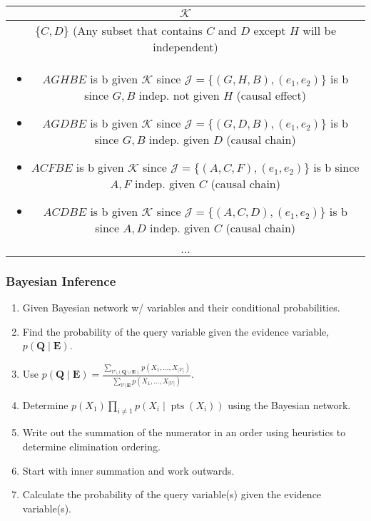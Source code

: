 \begin{example}
    \begin{center}
        \begin{tabular}{c}
            \toprule
            $\mathcal{K}$ \\
            \midrule
            $\{C,D\}$ (Any subset that contains $C$ and $D$ except $H$ will be independent) \\
            \multicolumn{1}{p{\linewidth}}{
                \begin{itemize}
                    \item $AGHBE$ is b given $\mathcal{K}$ since $\mathcal{J} = \{(G,H,B),(e_1,e_2)\}$ is b since $G,B$ indep. not given $H$ (causal effect)
                    \item $AGDBE$ is b given $\mathcal{K}$ since $\mathcal{J} = \{(G,D,B),(e_1,e_2)\}$ is b since $G,B$ indep. given $D$ (causal chain)
                    \item $ACFBE$ is b given $\mathcal{K}$ since $\mathcal{J} = \{(A,C,F),(e_1,e_2)\}$ is b since $A,F$ indep. given $C$ (causal chain)
                    \item $ACDBE$ is b given $\mathcal{K}$ since $\mathcal{J} = \{(A,C,D),(e_1,e_2)\}$ is b since $A,D$ indep. given $C$ (causal chain)
                \end{itemize}} \\
            \midrule
            $\ldots$ \\
            \toprule
        \end{tabular}
    \end{center}
\end{example}
\newpage

\subsubsection{Bayesian Inference}
\begin{process}
    \begin{enumerate}
        \item Given Bayesian network w/ variables and their conditional probabilities.
        \item Find the probability of the query variable given the evidence variable, $p(\mathbf{Q} \mid \mathbf{E})$.
        \item Use $p(\mathbf{Q} \mid \mathbf{E}) = \frac{\sum_{\mathcal{V} \setminus (\mathbf{Q} \cup \mathbf{E})} p(X_1, \dots, X_{|\mathcal{V}|})}{\sum_{\mathcal{V} \setminus \mathbf{E}} p(X_1, \dots, X_{|\mathcal{V}|})}$.
        \item Determine $p(X_1) \prod_{i \neq 1} p(X_i \mid \operatorname{pts}(X_i))$ using the Bayesian network. 
        \item Write out the summation of the numerator in an order using heuristics to determine elimination ordering. 
        \item Start with inner summation and work outwards.
        \item Calculate the probability of the query variable(s) given the evidence variable(s).
    \end{enumerate}
\end{process}

